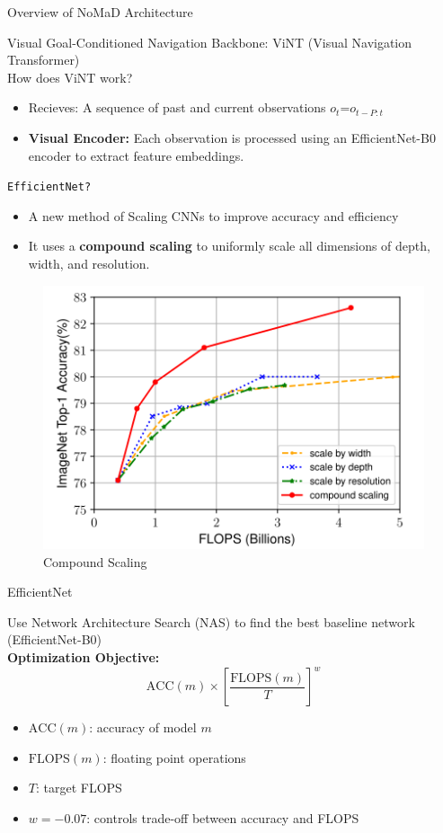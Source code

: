 \documentclass{beamer}
\begin{document}
\begin{frame}{Overview of NoMaD Architecture}
    \begin{block}{Visual Goal-Conditioned Navigation}
        Backbone: ViNT (Visual Navigation Transformer)\\
        How does ViNT work?
        \begin{itemize}
            \item Recieves: A sequence of past and current observations $o_t$=$o_{t-P:t}$
            \item \textbf{Visual Encoder:} Each observation is processed using an EfficientNet-B0 encoder to extract feature embeddings.
        \end{itemize}
        \pause
        \texttt{EfficientNet?}
        \begin{itemize}
            \item A new method of Scaling CNNs to improve accuracy and efficiency
            \item It uses a \textbf{compound scaling} to uniformly scale all dimensions of depth, width, and resolution.
        \end{itemize}
    \end{block}
\end{frame}
\begin{frame}
    \begin{figure}
        \centering
        \includegraphics[width=0.8\linewidth]{effnet_scaling.png}
        \caption{Compound Scaling}
        \label{fig:efficientnet}
    \end{figure}
\end{frame}
\begin{frame}{EfficientNet}
    \begin{block}{}
        Use Network Architecture Search (NAS) to find the best baseline network (EfficientNet-B0)\\
        \bigskip
        \textbf{Optimization Objective:}
    \[
    \text{ACC}(m) \times \left[\frac{\text{FLOPS}(m)}{T}\right]^w
    \]
    \begin{itemize}
        \item $\text{ACC}(m)$: accuracy of model $m$
        \item $\text{FLOPS}(m)$: floating point operations
        \item $T$: target FLOPS
        \item $w = -0.07$: controls trade-off between accuracy and FLOPS
    \end{itemize}
    \end{block}
\end{frame}
\end{document}
